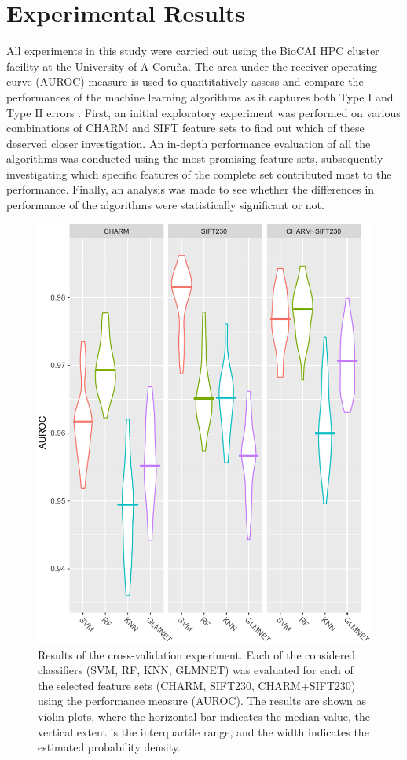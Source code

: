 \section{Experimental Results}
\label{sec:experimental-results}
All experiments in this study were carried out using the BioCAI HPC cluster facility at the University of A Coru\~{n}a. The area under the receiver operating curve (AUROC) measure is used to quantitatively assess and compare the performances of the machine learning algorithms as it captures both Type I and Type II errors \cite{fawcett2006introduction}. First, an initial exploratory experiment was performed on various combinations of CHARM and SIFT feature sets to find out which of these deserved closer investigation. An in-depth performance evaluation of all the algorithms was conducted using the most promising feature sets, subsequently investigating which specific features of the complete set contributed most to the performance. Finally, an analysis was made to see whether the differences in performance of the algorithms were statistically significant or not.
\begin{figure}[h!]
	\centering
	\includegraphics[width=0.9\columnwidth]{fig05}
	\caption{Results of the cross-validation experiment. Each of the considered classifiers (SVM, RF, KNN, GLMNET) was evaluated for each of the selected feature sets (CHARM, SIFT230, CHARM+SIFT230) using the performance measure (AUROC). The results are shown as violin plots, where the horizontal bar indicates the median value, the vertical extent is the interquartile range, and the width indicates the estimated probability density.}
	\label{ch5_fig5}
\end{figure}
